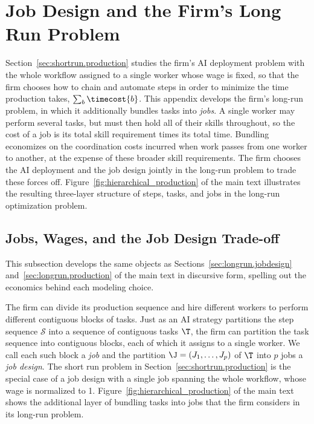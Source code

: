 \section{Job Design and the Firm's Long Run Problem}
\label{app:jobdesign}

Section~\ref{sec:shortrun.production} studies the firm's AI deployment problem with the whole workflow assigned to a single worker whose wage is fixed, so that the firm chooses how to chain and automate steps in order to minimize the time production takes, $\sum_b \timecost{b}$.
This appendix develops the firm's long-run problem, in which it additionally bundles tasks into \emph{jobs}.
A single worker may perform several tasks, but must then hold all of their skills throughout, so the cost of a job is its total skill requirement times its total time.
Bundling economizes on the coordination costs incurred when work passes from one worker to another, at the expense of these broader skill requirements. 
The firm chooses the AI deployment and the job design jointly in the long-run problem to trade these forces off.
Figure~\ref{fig:hierarchical_production} of the main text illustrates the resulting three-layer structure of steps, tasks, and jobs in the long-run optimization problem.


\subsection{Jobs, Wages, and the Job Design Trade-off}
\label{sec:app.jobs}

This subsection develops the same objects as Sections~\ref{sec:longrun.jobdesign} and~\ref{sec:longrun.production} of the main text in discursive form, spelling out the economics behind each modeling choice.


The firm can divide its production sequence and hire different workers to perform different contiguous blocks of tasks.
Just as an AI strategy partitions the step sequence $\mathcal{S}$ into a sequence of contiguous tasks $\T$, the firm can partition the task sequence into contiguous blocks, each of which it assigns to a single worker.
We call each such block a \emph{job} and the partition $\J = (J_1, \dotsc, J_p)$ of $\T$ into $p$ jobs a \emph{job design}.
The short run problem in Section~\ref{sec:shortrun.production} is the special case of a job design with a single job spanning the whole workflow, whose wage is normalized to 1.
Figure~\ref{fig:hierarchical_production} of the main text shows the additional layer of bundling tasks into jobs that the firm considers in its long-run problem.


